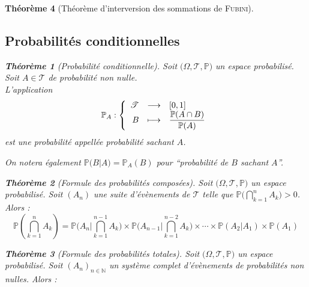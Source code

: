 \documentclass[11pt,a4paper]{report}
\newtheorem{theorem}{Théorème}[chapter]
\newtheorem{itheorem}[theorem]{Théorème}
\theoremstyle{definition}
\begin{document}
\begin{theorem}[Théorème d'interversion des sommations de \textsc{Fubini}]
{{\subsection{Probabilités conditionnelles} %
\label{sub:probabilites_conditionnelles}
\begin{itheorem}[Probabilité conditionnelle]
     Soit $\big( \Omega , \mathscr{T}, \mathbb{P} \big)$ un espace probabilisé. \newline
     Soit $A \in \mathscr{T}$ de probabilité non nulle. \\
     L'application 
     \begin{equation}
     \mathbb{P}_A : \left\lbrace
     \begin{array}{r c l}
          \mathscr{T} &\longrightarrow & [0,1] \\
          B &\longmapsto & \dfrac{\mathbb{P} (A\cap B)}{\mathbb{P} (A)}
     \end{array}
     \right.
     \end{equation}
     est une probabilité appellée \emph{probabilité sachant $A$}.
\end{itheorem}
On notera également $\mathbb{P}\big( B | A\big) = \mathbb{P}_A(B)$ pour ``probabilité de $B$ sachant $A$''.
\begin{theorem}[Formule des probabilités composées]
     Soit $\big( \Omega , \mathscr{T}, \mathbb{P} \big)$ un espace probabilisé. \newline
     Soit $(A_n)$ une suite d'évènements de $\mathscr{T}$ telle que $\mathbb{P} \Big( \bigcap_{k=1}^n A_k \Big) > 0$. Alors :
     \begin{equation}
     \mathbb{P} \left( \bigcap_{k=1}^n A_k \right) = \mathbb{P}\Bigg(A_n \Bigg| \bigcap_{k=1}^{n-1} A_k \Bigg) \times \mathbb{P}\Bigg(A_{n-1} \Bigg| \bigcap_{k=1}^{n-2} A_k \Bigg) \times \cdots \times \mathbb{P}(A_2|A_1) \times \mathbb{P}(A_1)
     \end{equation}
\end{theorem}
\begin{itheorem}[Formule des probabilités totales]
     Soit $\big( \Omega , \mathscr{T}, \mathbb{P} \big)$ un espace probabilisé. \newline
     Soit $(A_n)_{n\in\mathbb{N}}$ un \emph{système complet} d'évènements de probabilités non nulles. Alors :
     \begin{equation}

\end{equation}
\end{itheorem}}}
\end{theorem}
\end{document}

